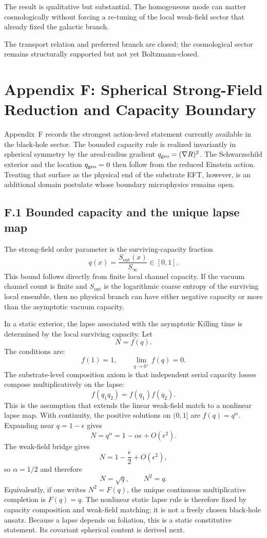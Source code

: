 \documentclass[11pt]{article}
\begin{document}
The result is qualitative but substantial. The homogeneous mode can matter cosmologically without forcing a re-tuning of the local weak-field sector that already fixed the galactic branch.

The transport relation and preferred branch are closed; the cosmological sector remains structurally supported but not yet Boltzmann-closed.

\section*{Appendix F: Spherical Strong-Field Reduction and Capacity Boundary}

Appendix~F records the strongest action-level statement currently available in the black-hole sector. The bounded capacity rule is realized invariantly in spherical symmetry by the areal-radius gradient $q_{\rm geo}=(\nabla R)^2$. The Schwarzschild exterior and the location $q_{\rm geo}=0$ then follow from the reduced Einstein action. Treating that surface as the physical end of the substrate EFT, however, is an additional domain postulate whose boundary microphysics remains open.

\subsection*{F.1 Bounded capacity and the unique lapse map}

The strong-field order parameter is the surviving-capacity fraction
\[
q(x)=\frac{S_{\mathrm{ent}}(x)}{S_\infty}\in[0,1].
\]
This bound follows directly from finite local channel capacity. If the vacuum channel count is finite and $S_{\mathrm{ent}}$ is the logarithmic coarse entropy of the surviving local ensemble, then no physical branch can have either negative capacity or more than the asymptotic vacuum capacity.

In a static exterior, the lapse associated with the asymptotic Killing time is determined by the local surviving capacity. Let
\[
N=f(q).
\]
The conditions are:
\[
f(1)=1,\qquad \lim_{q\to0^+}f(q)=0.
\]
The substrate-level composition axiom is that independent serial capacity losses compose multiplicatively on the lapse:
\[
f(q_1q_2)=f(q_1)f(q_2).
\]
This is the assumption that extends the linear weak-field match to a nonlinear lapse map. With continuity, the positive solutions on $(0,1]$ are $f(q)=q^\alpha$. Expanding near $q=1-\epsilon$ gives
\[
N=q^\alpha=1-\alpha\epsilon+O(\epsilon^2).
\]
The weak-field bridge gives
\[
N=1-\frac{\epsilon}{2}+O(\epsilon^2),
\]
so $\alpha=1/2$ and therefore
\[
N=\sqrt q,
\qquad
N^2=q.
\]
Equivalently, if one writes $N^2=F(q)$, the unique continuous multiplicative completion is $F(q)=q$. The nonlinear static lapse rule is therefore fixed by capacity composition and weak-field matching; it is not a freely chosen black-hole ansatz. Because a lapse depends on foliation, this is a static constitutive statement. Its covariant spherical content is derived next.
\end{document}
